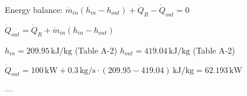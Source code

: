 Energy balance:  
\( \dot{m}_{in} (h_{in} - h_{out}) + \dot{Q}_R - \dot{Q}_{out} = 0 \)  

\( \dot{Q}_{out} = \dot{Q}_R + \dot{m}_{in} (h_{in} - h_{out}) \)  

\( h_{in} = 209.95 \, \text{kJ/kg} \) (Table A-2)  
\( h_{out} = 419.04 \, \text{kJ/kg} \) (Table A-2)  

\( \dot{Q}_{out} = 100 \, \text{kW} + 0.3 \, \text{kg/s} \cdot (209.95 - 419.04) \, \text{kJ/kg} = 62.193 \, \text{kW} \)  

---